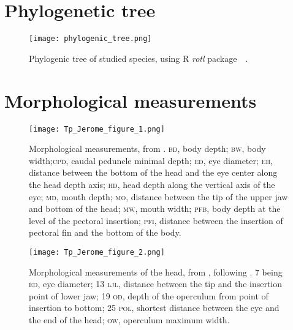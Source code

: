
\renewcommand\thefigure{\thesection.\arabic{figure}}
\setcounter{figure}{0}

\section{Phylogenetic tree}
\begin{figure} [!htbp]
	\begin{center}
		\texttt{[image: phylogenic\_tree.png]}
	\end{center}
	\caption[Petite légende]{Phylogenic tree of studied species, using R \emph{rotl} package~\citep{opentreeoflife2019}~.}
	\label{fig:phylotree}
\end{figure}


\section{Morphological measurements}
\begin{figure} [!htbp]
	\begin{center}
		\texttt{[image: Tp\_Jerome\_figure\_1.png]}
		\caption[Petite légende]{Morphological measurements, from \citet{albouy2011}. \textsc{bd}, body depth; \textsc{bw}, body width;\textsc{cpd}, caudal peduncle minimal depth; \textsc{ed}, eye diameter; \textsc{eh}, distance between the bottom of the head and the eye center along the head depth axis; \textsc{hd}, head depth along the vertical axis of the eye; \textsc{md}, mouth depth; \textsc{mo}, distance between the tip of the upper jaw and bottom of the head; \textsc{mw}, mouth width; \textsc{pfb}, body depth at the level of the pectoral insertion; \textsc{pfi}, distance between the insertion of pectoral fin and the bottom of the body.}
	\label{fig:full_body}
	\end{center}
\end{figure}


\begin{figure} [!htbp]
	\begin{center}
		\texttt{[image: Tp\_Jerome\_figure\_2.png]}
		\caption[Petite légende]{Morphological measurements of the head, from \citet{diderich2006}, following \citet{sibbing2000}. 7 being \textsc{ed}, eye diameter; 13 \textsc{ljl}, distance between the tip and the insertion point of lower jaw; 19 \textsc{od}, depth of the operculum from point of insertion to bottom; 25 \textsc{pol}, shortest distance between the eye and the end of the head; \textsc{ow}, operculum maximum width.}
	\label{fig:head}
	\end{center}
	
\end{figure}


